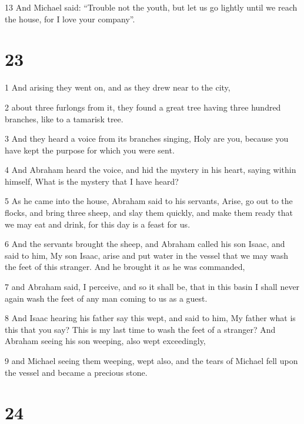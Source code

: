 \par 13 And Michael said: “Trouble not the youth, but let us go lightly until we reach the house, for I love your company”.

\chapter{23}

\par 1 And arising they went on, and as they drew near to the city, 

\par 2 about three furlongs from it, they found a great tree having three hundred branches, like to a tamarisk tree. 

\par 3 And they heard a voice from its branches singing, Holy are you, because you have kept the purpose for which you were sent. 

\par 4 And Abraham heard the voice, and hid the mystery in his heart, saying within himself, What is the mystery that I have heard? 

\par 5 As he came into the house, Abraham said to his servants, Arise, go out to the flocks, and bring three sheep, and slay them quickly, and make them ready that we may eat and drink, for this day is a feast for us. 

\par 6 And the servants brought the sheep, and Abraham called his son Isaac, and said to him, My son Isaac, arise and put water in the vessel that we may wash the feet of this stranger. And he brought it as he was commanded, 

\par 7 and Abraham said, I perceive, and so it shall be, that in this basin I shall never again wash the feet of any man coming to us as a guest. 

\par 8 And Isaac hearing his father say this wept, and said to him, My father what is this that you say? This is my last time to wash the feet of a stranger? And Abraham seeing his son weeping, also wept exceedingly, 

\par 9 and Michael seeing them weeping, wept also, and the tears of Michael fell upon the vessel and became a precious stone.

\chapter{24}

